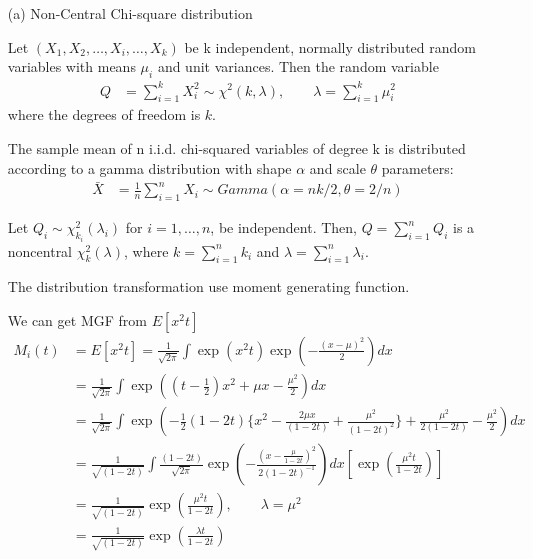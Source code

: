 \begin{itemize}

\item[(a)] Non-Central Chi-square distribution
\begin{definition}
Let $(X_{1},X_{2},\ldots ,X_{i},\ldots ,X_{k})$ be k independent, normally distributed random variables with means $\mu _{i}$ and unit variances. Then the random variable
\begin{align*}
    Q &= \sum_{i=1}^k X_i^2 \sim \chi^2(k, \lambda), \qquad \lambda = \sum_{i=1}^k \mu_i^2
\end{align*}
where the degrees of freedom is $k$.


The sample mean of n i.i.d. chi-squared variables of degree k is distributed according to a gamma distribution with shape $\alpha$  and scale $\theta$  parameters:
\begin{align*}
	\bar{X} &= \frac{1}{n} \sum_{i=1}^n X_i \sim Gamma(\alpha = nk/2, \theta = 2/n)
\end{align*}
\end{definition}

\begin{lemma}	

Let $Q_i \sim \chi^2 _{k_i}(\lambda_i)$ for $i=1,…,n$, be independent. Then, $Q = \sum_{i=1}^n Q_i$ is a noncentral $\chi^2_k(\lambda)$, where $k = \sum_{i=1}^n k_i$ and $\lambda =\sum_{i=1}^n \lambda_i$.
\end{lemma}



The distribution transformation use moment generating function.

We can get MGF from $E[x^2 t]$
\begin{align*}
	M_i(t) &= E[x^2 t] = \frac{1}{\sqrt{2\pi}} \int \exp(x^2 t) \exp \left( - \frac{(x-\mu)^2}{2} \right) dx\\
	&=  \frac{1}{\sqrt{2\pi}}  \int \exp \left( (t- \frac{1}{2}) x^2 + \mu x -\frac{\mu^2}{2} \right) dx \\
	&=  \frac{1}{\sqrt{2\pi}}  \int \exp \left(  -\frac{1}{2}(1-2t) \{ x^2 - \frac{2 \mu x}{(1-2t)} + \frac{\mu^2}{(1-2t)^2} \} + \frac{\mu^2}{2(1-2t)} -\frac{\mu^2}{2}  \right) dx \\
	&= \frac{1}{\sqrt{(1-2t)}} \int \frac{(1-2t)}{\sqrt{2\pi}} \exp\left( -\frac{(x-\frac{\mu}{1-2t})^2}{2 (1-2t)^{-1}} \right) dx \left[\exp \left( \frac{\mu^2 t}{1-2t} \right) \right]\\
	&=\frac{1}{\sqrt{(1-2t)}} \exp \left( \frac{\mu^2 t}{1-2t} \right), \qquad \lambda = \mu^2\\
	&=\frac{1}{\sqrt{(1-2t)}} \exp \left( \frac{\lambda t}{1-2t} \right)
\end{align*}


\end{itemize}

